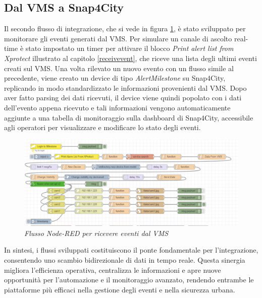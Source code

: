 \documentclass[a4paper, openright, thesis]{report}
\begin{document}
\subsection{Dal VMS a Snap4City}
Il secondo flusso di integrazione, che si vede in figura \ref{15}, è stato sviluppato per monitorare gli eventi generati dal VMS. Per simulare un canale di ascolto real-time è stato impostato un timer per attivare il blocco \textit{Print alert list from Xprotect} illustrato al capitolo \ref{receivevent}, che riceve una lista degli ultimi eventi creati sul VMS.
Una volta rilevato un nuovo evento con un flusso simile al precedente, viene creato un device di tipo \textit{AlertMilestone} su Snap4City, replicando in modo standardizzato le informazioni provenienti dal VMS.
Dopo aver fatto parsing dei dati ricevuti, il device viene quindi popolato con i dati dell’evento appena ricevuto e tali informazioni vengono automaticamente aggiunte a una tabella di monitoraggio sulla dashboard di Snap4City, accessibile agli operatori per visualizzare e modificare lo stato degli eventi.
\begin{figure}[H]
    \centering
    \includegraphics[width=1\linewidth]{img/VMStoS4C.png}
    \caption{\textit{Flusso Node-RED per ricevere eventi dal VMS}}
    \label{15}
\end{figure}
In sintesi, i flussi sviluppati costituiscono il ponte fondamentale per l’integrazione, consentendo uno scambio bidirezionale di dati in tempo reale. Questa sinergia migliora l’efficienza operativa, centralizza le informazioni e apre nuove opportunità per l’automazione e il monitoraggio avanzato, rendendo entrambe le piattaforme più efficaci nella gestione degli eventi e nella sicurezza urbana.
\end{document}
